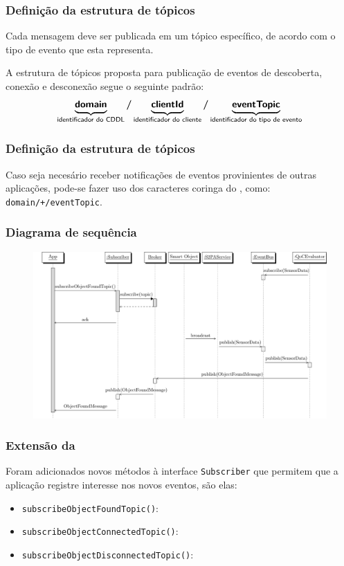 \documentclass[aspectratio=169]{beamer}
\begin{document}
\begin{frame}
	\frametitle{Definição da estrutura de tópicos}
	Cada mensagem deve ser publicada em um tópico específico, de acordo com o tipo de evento que esta representa.

	\bigskip

	A estrutura de tópicos proposta para publicação de eventos de descoberta, conexão e desconexão segue o seguinte padrão:
	\[
		\underbrace{\bm{\mathsf{domain}}\vphantom{p}}_{\text{\textsf{identificador do CDDL}}}
		\bm{/}
		\underbrace{\bm{\mathsf{clientId}}\vphantom{p}}_{\text{\textsf{identificador do cliente}}}
		\bm{/}
		\underbrace{\bm{\mathsf{eventTopic}}}_{\text{\textsf{identificador do tipo de evento}}}
	\]
\end{frame}

\begin{frame}
	\frametitle{Definição da estrutura de tópicos}
	Caso seja necesário receber notificações de eventos provinientes de outras aplicações, pode-se fazer uso dos caracteres coringa do \mqtt, como:
	\texttt{domain/+/eventTopic}.
\end{frame}

\begin{frame}
	\frametitle{Diagrama de sequência}
	\begin{figure}
		\centering
		\includegraphics[width=.85\linewidth]{img/solution-sequence.pdf}
	\end{figure}
\end{frame}

\begin{frame}
	\frametitle{Extensão da \api}
	Foram adicionados novos métodos à interface \texttt{Subscriber} que permitem que a aplicação registre interesse nos novos eventos, são elas:
	\begin{itemize}
		\item \texttt{subscribeObjectFoundTopic()}:

		\item \texttt{subscribeObjectConnectedTopic()}:

		\item \texttt{subscribeObjectDisconnectedTopic()}:
	\end{itemize}
\end{frame}
\end{document}
